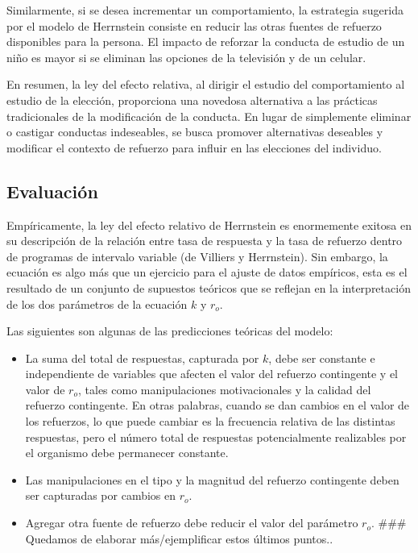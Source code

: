 \documentclass[
  a4paper,
  DIV=11,
  numbers=noendperiod]{scrreprt}
\providecommand{\tightlist}{%
  \setlength{\itemsep}{0pt}\setlength{\parskip}{0pt}}\usepackage{longtable,booktabs,array}
\begin{document}
Similarmente, si se desea incrementar un comportamiento, la estrategia
sugerida por el modelo de Herrnstein consiste en reducir las otras
fuentes de refuerzo disponibles para la persona. El impacto de reforzar
la conducta de estudio de un niño es mayor si se eliminan las opciones
de la televisión y de un celular.

En resumen, la ley del efecto relativa, al dirigir el estudio del
comportamiento al estudio de la elección, proporciona una novedosa
alternativa a las prácticas tradicionales de la modificación de la
conducta. En lugar de simplemente eliminar o castigar conductas
indeseables, se busca promover alternativas deseables y modificar el
contexto de refuerzo para influir en las elecciones del individuo.

\subsection{Evaluación}\label{evaluaciuxf3n}

Empíricamente, la ley del efecto relativo de Herrnstein es enormemente
exitosa en su descripción de la relación entre tasa de respuesta y la
tasa de refuerzo dentro de programas de intervalo variable (de Villiers
y Herrnstein). Sin embargo, la ecuación es algo más que un ejercicio
para el ajuste de datos empíricos, esta es el resultado de un conjunto
de supuestos teóricos que se reflejan en la interpretación de los dos
parámetros de la ecuación \(k\) y \(r_o\).

Las siguientes son algunas de las predicciones teóricas del modelo:

\begin{itemize}
\tightlist
\item
  La suma del total de respuestas, capturada por \(k\), debe ser
  constante e independiente de variables que afecten el valor del
  refuerzo contingente y el valor de \(r_o\), tales como manipulaciones
  motivacionales y la calidad del refuerzo contingente. En otras
  palabras, cuando se dan cambios en el valor de los refuerzos, lo que
  puede cambiar es la frecuencia relativa de las distintas respuestas,
  pero el número total de respuestas potencialmente realizables por el
  organismo debe permanecer constante.
\item
  Las manipulaciones en el tipo y la magnitud del refuerzo contingente
  deben ser capturadas por cambios en \(r_o\).
\item
  Agregar otra fuente de refuerzo debe reducir el valor del parámetro
  \(r_o\). \#\#\# Quedamos de elaborar más/ejemplificar estos últimos
  puntos..
\end{itemize}
\end{document}
